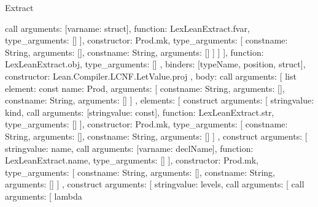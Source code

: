 \begin{lexlean}{Extract}
\begin{toolingmodule}
{{{{{{{                        call{
                          arguments: [var{name: struct}],
                          function: LexLeanExtract.fvar,
                          type_arguments: []
                        }
                      ],
                      constructor: Prod.mk,
                      type_arguments: [
                        const{name: String, arguments: []},
                        const{name: String, arguments: []}
                      ]
                    }
                  ]
                }
              ],
              function: LexLeanExtract.obj,
              type_arguments: []
            },
            binders: [typeName, position, struct],
            constructor: Lean.Compiler.LCNF.LetValue.proj
          },
          {
            body: call{
              arguments: [
                list{
                  element: const{
                    name: Prod,
                    arguments: [
                      const{name: String, arguments: []},
                      const{name: String, arguments: []}
                    ]
                  },
                  elements: [
                    construct{
                      arguments: [
                        string{value: kind},
                        call{
                          arguments: [string{value: const}],
                          function: LexLeanExtract.str,
                          type_arguments: []
                        }
                      ],
                      constructor: Prod.mk,
                      type_arguments: [
                        const{name: String, arguments: []},
                        const{name: String, arguments: []}
                      ]
                    },
                    construct{
                      arguments: [
                        string{value: name},
                        call{
                          arguments: [var{name: declName}],
                          function: LexLeanExtract.name,
                          type_arguments: []
                        }
                      ],
                      constructor: Prod.mk,
                      type_arguments: [
                        const{name: String, arguments: []},
                        const{name: String, arguments: []}
                      ]
                    },
                    construct{
                      arguments: [
                        string{value: levels},
                        call{
                          arguments: [
                            call{
                              arguments: [
                                lambda{
}}}}}}}}}}
\end{toolingmodule}
\end{lexlean}
